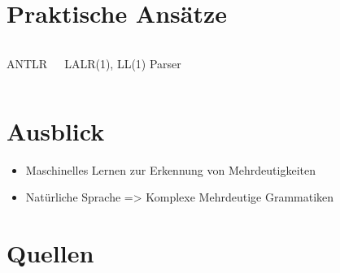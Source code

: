 \documentclass[t]{beamer}
\begin{document}
	\section{Praktische Ansätze}\label{sec:praktische-ansatze}
	\begin{frame}
		\begin{columns}[T]
			\begin{block}{ANTLR}

			\end{block}
			\begin{block}{LALR(1), LL(1) Parser}

			\end{block}
		\end{columns}
	\end{frame}


	\section{Ausblick}\label{sec:ausblick-und-zukunftige-projekte}
	\begin{frame}
		\begin{itemize}
			\item Maschinelles Lernen zur Erkennung von Mehrdeutigkeiten
			\item Natürliche Sprache => Komplexe Mehrdeutige Grammatiken
		\end{itemize}
	\end{frame}


	\section{Quellen}\label{sec:quellen}
	\begin{frame}[allowframebreaks]
		
		
	\end{frame}
\end{document}
